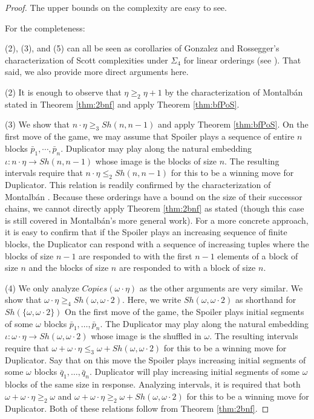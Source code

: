 \documentclass[11pt]{amsart}
\theoremstyle{definition}
\begin{document}
\begin{proof} The upper bounds on the complexity are easy to see. 


\medskip

For the completeness:

(2), (3), and (5) can all be seen as corollaries of Gonzalez and Rossegger's characterization of Scott complexities under $\Sigma_4$ for linear orderings (see \cite{GR23}).
That said, we also provide more direct arguments here.

(2) It is enough to observe that $\eta\geq_2\eta+1$ by the characterization of Montalb\'an stated in Theorem \ref{thm:2bnf} and apply Theorem \ref{thm:bfPoS}.


(3) We show that $n\cdot\eta\geq_3Sh(n,n-1)$ and apply Theorem \ref{thm:bfPoS}.
On the first move of the game, we may assume that Spoiler plays a sequence of entire $n$ blocks $\bar{p}_1,\cdots,\bar{p}_n$.
Duplicator may play along the natural embedding $\iota:n\cdot\eta\to Sh(n,n-1)$ whose image is the blocks of size $n$.
The resulting intervals require that $n\cdot\eta\leq_2Sh(n,n-1)$ for this to be a winning move for Duplicator.
This relation is readily confirmed by the characterization of Montalb\'an \cite{McountingBF}.
Because these orderings have a bound on the size of their successor chains, we cannot directly apply Theorem \ref{thm:2bnf} as stated (though this case is still covered in Montalb\'an's more general work).
For a more concrete approach, it is easy to confirm that if the Spoiler plays an increasing sequence of finite blocks, the Duplicator can respond with a sequence of increasing tuples where the blocks of size $n-1$ are responded to with the first $n-1$ elements of a block of size $n$ and the blocks of size $n$ are responded to with a block of size $n$.

\medskip

(4) We only analyze $Copies( \omega \cdot \eta )$ as the other arguments are very similar.
We show that $\omega\cdot\eta\geq_4Sh(\omega,\omega\cdot2).$
Here, we write $Sh(\omega,\omega\cdot2)$ as shorthand for $Sh(\{\omega,\omega\cdot2\})$
On the first move of the game, the Spoiler plays initial segments of some $\omega$ blocks $\bar{p}_1,\ldots,\bar{p}_n$.
The Duplicator may play along the natural embedding $\iota:\omega\cdot\eta\to Sh(\omega,\omega\cdot2)$ whose image is the shuffled in $\omega$.
The resulting intervals require that $\omega+\omega\cdot\eta\leq_3\omega+Sh(\omega,\omega\cdot2)$ for this to be a winning move for Duplicator.
Say that on this move the Spoiler plays increasing initial segments of some $\omega$ blocks $\bar{q}_1,\dots,\bar{q}_n$.
Duplicator will play increasing initial segments of some $\omega$ blocks of the same size in response.
Analyzing intervals, it is required that both $\omega+\omega\cdot\eta\geq_2\omega$ and $\omega+\omega\cdot\eta\geq_2\omega+Sh(\omega,\omega\cdot2)$ for this to be a winning move for Duplicator.
Both of these relations follow from Theorem \ref{thm:2bnf}. 


\end{proof}
\end{document}
